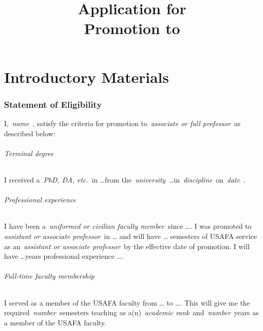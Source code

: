\documentclass[11pt,titlepage]{article}
\title{Application for\\Promotion to \meta{Academic Rank}}
\author{\meta{Applicant Name}}
\date{\meta{Semester of Application}}
\providecommand*{\meta}[1]{%
  \textlangle\,\emph{#1}\,\textrangle%
}
\begin{document}
\maketitle

\tableofcontents
\clearpage
{}


\part{Introductory Materials}\label{section:introduction}  %

\section{Statement of Eligibility}  %

I, \meta{name}, satisfy the criteria for promotion to \meta{associate or full professor} as described below:

\paragraph{Terminal degree}
I received a \meta{PhD, DA, etc.} in \dots from the \meta{university} \dots in \meta{discipline} on \meta{date}.

\paragraph{Professional experience}
I have been a \meta{uniformed or civilian faculty member} since \dots.
I was promoted to \meta{assistant or associate professor} in \dots{} and will have \dots{} semesters of USAFA service as an \meta{assistant or associate professor} by the effective date of promotion.
I will have \dots years professional experience \dots.

\paragraph{Full-time faculty membership}
I served as a member of the USAFA faculty from \dots{} to \dots.
This will give me the required \meta{number} semesters teaching as a(n) \meta{academic rank} and \meta{number} years as a member of the USAFA faculty.
\end{document}
